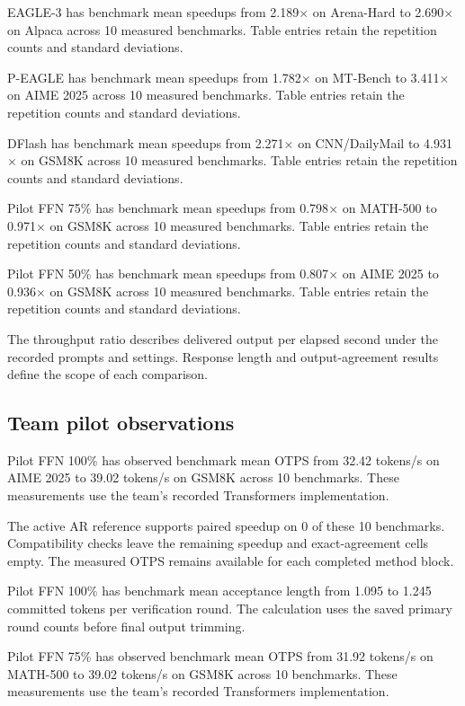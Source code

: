 \documentclass[conference,onecolumn]{IEEEtran}
\begin{document}
EAGLE-3 has benchmark mean speedups from 2.189\(\times\) on Arena-Hard to 2.690\(\times\) on Alpaca across 10 measured benchmarks. Table entries retain the repetition counts and standard deviations.

P-EAGLE has benchmark mean speedups from 1.782\(\times\) on MT-Bench to 3.411\(\times\) on AIME 2025 across 10 measured benchmarks. Table entries retain the repetition counts and standard deviations.

DFlash has benchmark mean speedups from 2.271\(\times\) on CNN/DailyMail to 4.931\(\times\) on GSM8K across 10 measured benchmarks. Table entries retain the repetition counts and standard deviations.

Pilot FFN 75\% has benchmark mean speedups from 0.798\(\times\) on MATH-500 to 0.971\(\times\) on GSM8K across 10 measured benchmarks. Table entries retain the repetition counts and standard deviations.

Pilot FFN 50\% has benchmark mean speedups from 0.807\(\times\) on AIME 2025 to 0.936\(\times\) on GSM8K across 10 measured benchmarks. Table entries retain the repetition counts and standard deviations.

The throughput ratio describes delivered output per elapsed second under the recorded prompts and settings. Response length and output-agreement results define the scope of each comparison.

\subsection{Team pilot observations}

Pilot FFN 100\% has observed benchmark mean OTPS from 32.42 tokens/s on AIME 2025 to 39.02 tokens/s on GSM8K across 10 benchmarks. These measurements use the team's recorded Transformers implementation.

The active AR reference supports paired speedup on 0 of these 10 benchmarks. Compatibility checks leave the remaining speedup and exact-agreement cells empty. The measured OTPS remains available for each completed method block.

Pilot FFN 100\% has benchmark mean acceptance length from 1.095 to 1.245 committed tokens per verification round. The calculation uses the saved primary round counts before final output trimming.

Pilot FFN 75\% has observed benchmark mean OTPS from 31.92 tokens/s on MATH-500 to 39.02 tokens/s on GSM8K across 10 benchmarks. These measurements use the team's recorded Transformers implementation.
\end{document}
